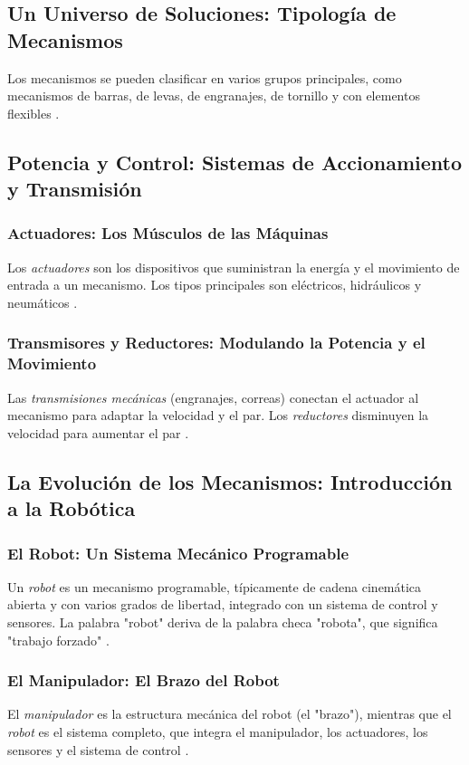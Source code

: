 \documentclass[12pt,a4paper]{article}
\begin{document}
\subsection{Un Universo de Soluciones: Tipología de Mecanismos}
Los mecanismos se pueden clasificar en varios grupos principales, como mecanismos de barras, de levas, de engranajes, de tornillo y con elementos flexibles \cite{lopez-cajun-2008}.

\subsection{Potencia y Control: Sistemas de Accionamiento y Transmisión}

\subsubsection{Actuadores: Los Músculos de las Máquinas}
Los \textit{actuadores} son los dispositivos que suministran la energía y el movimiento de entrada a un mecanismo. Los tipos principales son eléctricos, hidráulicos y neumáticos \cite{lopez-cajun-2008}.

\subsubsection{Transmisores y Reductores: Modulando la Potencia y el Movimiento}
Las \textit{transmisiones mecánicas} (engranajes, correas) conectan el actuador al mecanismo para adaptar la velocidad y el par. Los \textit{reductores} disminuyen la velocidad para aumentar el par \cite{lopez-cajun-2008}.

\subsection{La Evolución de los Mecanismos: Introducción a la Robótica}

\subsubsection{El Robot: Un Sistema Mecánico Programable}
Un \textit{robot} es un mecanismo programable, típicamente de cadena cinemática abierta y con varios grados de libertad, integrado con un sistema de control y sensores. La palabra "robot" deriva de la palabra checa "robota", que significa "trabajo forzado" \cite{lopez-cajun-2008}.

\subsubsection{El Manipulador: El Brazo del Robot}
El \textit{manipulador} es la estructura mecánica del robot (el "brazo"), mientras que el \textit{robot} es el sistema completo, que integra el manipulador, los actuadores, los sensores y el sistema de control \cite{lopez-cajun-2008}.
\end{document}
